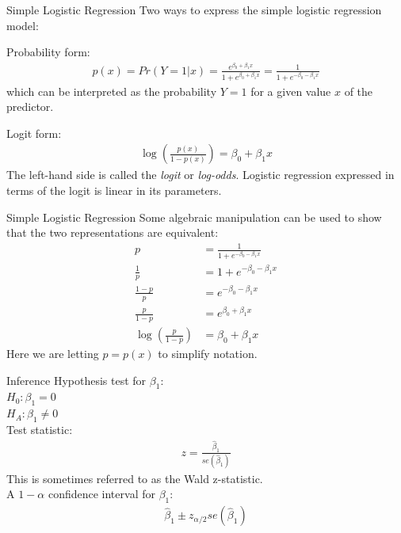 \documentclass[10pt]{beamer}\usepackage[]{graphicx}\usepackage[]{color}
\begin{document}
\begin{frame}{Simple Logistic Regression}
Two ways to express the simple logistic regression model:\\
\vspace{10pt}

Probability form:
\begin{align*}
p(x) = Pr(Y=1 | x) 
= \frac{e^{\beta_0 + \beta_1 x}}{1 + e^{\beta_0 + \beta_1 x}}
= \frac{1}{1 + e^{-\beta_0 - \beta_1 x}}
\end{align*}
which can be interpreted as the probability $Y=1$ for a given value $x$ of the predictor.
\vspace{10pt}

Logit form:
\begin{align*}
\log\left( \frac{p(x)}{1-p(x)} \right) = \beta_0 + \beta_1 x
\end{align*}
The left-hand side is called the \emph{logit} or \emph{log-odds}.  Logistic regression expressed in terms of the logit is linear in its parameters.
\end{frame}

\begin{frame}{Simple Logistic Regression}
Some algebraic manipulation can be used to show that the two representations are equivalent:
\begin{align*}
p &= \frac{1}{1 + e^{-\beta_0 - \beta_1 x}}\\
\frac{1}{p} &= 1 + e^{-\beta_0 - \beta_1 x}\\
\frac{1-p}{p} &= e^{-\beta_0 - \beta_1 x}\\
\frac{p}{1-p} &= e^{\beta_0 + \beta_1 x}\\
\log\left( \frac{p}{1-p} \right) &= \beta_0 + \beta_1 x
\end{align*}
Here we are letting $p = p(x)$ to simplify notation.\\
\end{frame}

\begin{frame}{Inference}
Hypothesis test for $\beta_1$:\\
$H_0: \beta_1 = 0$\\
$H_A: \beta_1 \neq 0$\\
\vspace{10pt}
Test statistic:
\begin{align*}
z = \frac{\hat{\beta}_1}{se(\hat{\beta}_1)}
\end{align*}
This is sometimes referred to as the Wald z-statistic.\\
\vspace{15pt}
A $1-\alpha$ confidence interval for $\beta_1$:
\begin{align*}
\hat{\beta}_1 \pm z_{\alpha/2} se(\hat{\beta}_1)
\end{align*}
\end{frame}
\end{document}
